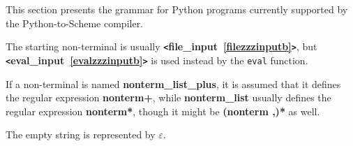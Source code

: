 This section presents the grammar for Python programs currently supported by the Python-to-Scheme compiler.

The starting non-terminal is usually {\bf \verb+<+file\_input~\ref{filezzzinputb}\verb+>+}, but {\bf \verb+<+eval\_input~\ref{evalzzzinputb}\verb+>+} is used instead by the \verb|eval| function.

If a non-terminal is named {\bf nonterm\_list\_plus}, it is assumed that it defines the regular expression {\bf nonterm+}, while {\bf nonterm\_list} usually defines the regular expression {\bf nonterm*}, though it might be {\bf (nonterm ,)*} as well.

The empty string is represented by $\varepsilon$.